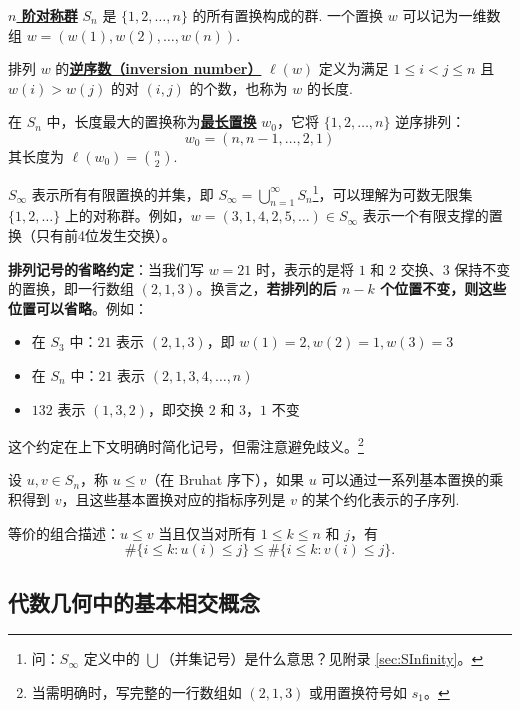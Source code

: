 \begin{Definition}
\label{def:SymmetricGroup}
\textbf{\underline{$n$ 阶对称群}} $S_n$ 是 $\{1, 2, \ldots, n\}$ 的所有置换构成的群. 一个置换 $w$ 可以记为一维数组 $w = (w(1), w(2), \ldots, w(n))$.

排列 $w$ 的\textbf{\underline{逆序数（inversion number）}} $\ell(w)$ 定义为满足 $1 \leq i < j \leq n$ 且 $w(i) > w(j)$ 的对 $(i, j)$ 的个数，也称为 $w$ 的长度.

在 $S_n$ 中，长度最大的置换称为\textbf{\underline{最长置换}} $w_0$，它将 $\{1,2,\ldots,n\}$ 逆序排列：
\[
w_0 = (n, n-1, \ldots, 2, 1)
\]
其长度为 $\ell(w_0) = \binom{n}{2}$.

$S_\infty$ 表示所有有限置换的并集，即 $S_\infty = \bigcup_{n=1}^\infty S_n$\footnote{问：$S_\infty$ 定义中的 $\bigcup$（并集记号）是什么意思？见附录 \cref{sec:SInfinity}。}，可以理解为可数无限集 $\{1, 2, \ldots\}$ 上的对称群。例如，$w = (3,1,4,2,5,\ldots) \in S_\infty$ 表示一个有限支撑的置换（只有前4位发生交换）。

\textbf{排列记号的省略约定}：当我们写 $w = 21$ 时，表示的是将 $1$ 和 $2$ 交换、$3$ 保持不变的置换，即一行数组 $(2,1,3)$。换言之，\textbf{若排列的后 $n-k$ 个位置不变，则这些位置可以省略}。例如：
\begin{itemize}
\item 在 $S_3$ 中：$21$ 表示 $(2,1,3)$，即 $w(1)=2, w(2)=1, w(3)=3$
\item 在 $S_n$ 中：$21$ 表示 $(2,1,3,4,\ldots,n)$
\item $132$ 表示 $(1,3,2)$，即交换 $2$ 和 $3$，$1$ 不变
\end{itemize}
这个约定在上下文明确时简化记号，但需注意避免歧义。\footnote{当需明确时，写完整的一行数组如 $(2,1,3)$ 或用置换符号如 $s_1$。}
\end{Definition}

\begin{Definition}
\label{def:BruhatOrder}
设 $u, v \in S_n$，称 $u \leq v$（在 Bruhat 序下），如果 $u$ 可以通过一系列基本置换的乘积得到 $v$，且这些基本置换对应的指标序列是 $v$ 的某个约化表示的子序列.

等价的组合描述：$u \leq v$ 当且仅当对所有 $1 \leq k \leq n$ 和 $j$，有
\[
\#\{i \leq k : u(i) \leq j\} \leq \#\{i \leq k : v(i) \leq j\}.
\]
\end{Definition}

\subsection{代数几何中的基本相交概念}
\label{sec:IntersectionConcepts}

